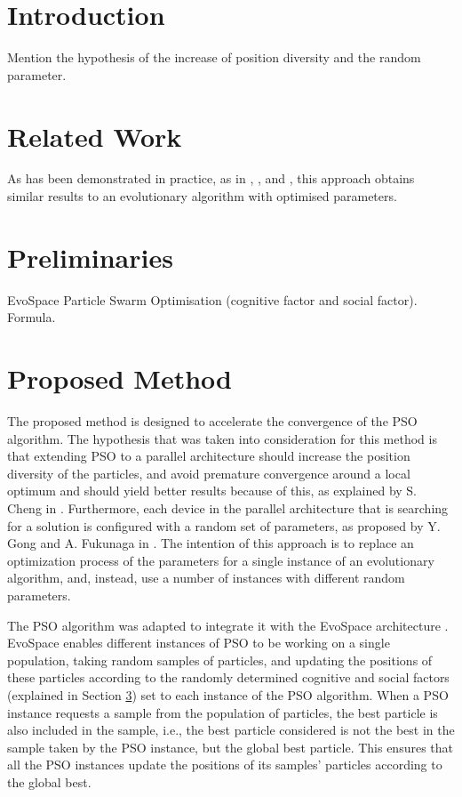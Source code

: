 \documentclass[runningheads,a4paper]{llncs}
\begin{document}
\section{Introduction}
\label{introduction}

Mention the hypothesis of the increase of position diversity and the random parameter.

\section{Related Work}
\label{related-work}

As has been demonstrated in practice, as
in \cite{garcia2014randomized}, \cite{gong2011distributed}, and
\cite{tanabe2013evaluation}, this approach obtains similar results to
an evolutionary algorithm with optimised parameters. %

\section{Preliminaries}
\label{preliminaries}

EvoSpace
Particle Swarm Optimisation (cognitive factor and social
factor). Formula.

\section{Proposed Method}
\label{proposed-method}

The proposed method is designed to accelerate the convergence of the
PSO algorithm. The hypothesis that was taken into consideration for this method is
that extending PSO to a parallel architecture should increase the
position diversity of the particles, and avoid premature convergence around a local
optimum and should yield better results because of this, as explained
by S. Cheng in \cite{cheng2013population}. Furthermore, each device in
the parallel architecture that is searching for a solution is configured with a
random set of parameters, as proposed by Y. Gong and
A. Fukunaga in \cite{gong2011distributed}. The intention of this approach is to
replace an optimization process of the parameters for a single instance of
an evolutionary algorithm, and, instead, use a number of instances with
different random parameters.  %

The PSO algorithm was adapted to integrate it with the EvoSpace
architecture \cite{garcia2015evospace}. EvoSpace enables different
instances of PSO to be working on a single population, taking random
samples of particles, and updating the positions of these particles
according to the randomly determined cognitive and social factors
(explained in Section \ref{preliminaries}) set to each instance of the
PSO algorithm. When a PSO instance requests a sample from the
population of particles, the best particle is also included in
the sample, i.e., the best particle considered is not the best in the
sample taken by the PSO instance, but the global best particle. This
ensures that all the PSO instances update the positions of its
samples' particles according to the global best.
\end{document}
